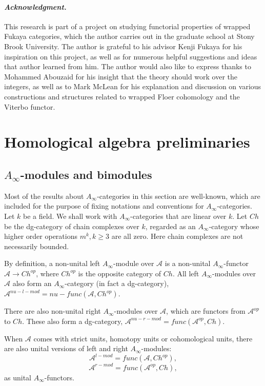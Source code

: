 \documentclass{amsart}
\numberwithin{equation}{section}
\numberwithin{figure}{section}
\begin{document}
\paragraph{\textit{Acknowledgment.}} This research is part of a project on studying functorial properties of wrapped Fukaya categories, which the author carries out in the graduate school at Stony Brook University. The author is grateful to his advisor Kenji Fukaya for his inspiration on this project, as well as for numerous helpful suggestions and ideas that author learned from him. The author would also like to express thanks to Mohammed Abouzaid for his insight that the theory should work over the integers, as well as to Mark McLean for his explanation and discussion on various constructions and structures related to wrapped Floer cohomology and the Viterbo functor.

\section{Homological algebra preliminaries}

\subsection{$A_{\infty}$-modules and bimodules}
	Most of the results about $A_{\infty}$-categories in this section are well-known, which are included for the purpose of fixing notations and conventions for $A_{\infty}$-categories.
	Let $k$ be a field. We shall work with $A_{\infty}$-categories that are linear over $k$. Let $Ch$ be the dg-category of chain complexes over $k$, regarded as an $A_{\infty}$-category whose higher order operations $m^{k}, k \ge 3$ are all zero. Here chain complexes are not necessarily bounded. \par
	By definition, a non-unital left $A_{\infty}$-module over $\mathcal{A}$ is a non-unital $A_{\infty}$-functor $\mathcal{A} \to Ch^{op}$, where $Ch^{op}$ is the opposite category of $Ch$. All left $A_{\infty}$-modules over $\mathcal{A}$ also form an $A_{\infty}$-category (in fact a dg-category), $\mathcal{A}^{nu-l-mod} = nu-func(\mathcal{A}, Ch^{op})$. \par
	There are also non-unital right $A_{\infty}$-modules over $\mathcal{A}$, which are functors from $\mathcal{A}^{op}$ to $Ch$. These also form a dg-category, $\mathcal{A}^{nu-r-mod} = func(\mathcal{A}^{op}, Ch)$. \par
	When $\mathcal{A}$ comes with strict units, homotopy units or cohomological units, there are also unital versions of left and right $A_{\infty}$-modules:
\begin{equation*}
\mathcal{A}^{l-mod} = func(\mathcal{A}, Ch^{op}),
\end{equation*}
\begin{equation*}
\mathcal{A}^{r-mod} = func(\mathcal{A}^{op}, Ch),
\end{equation*}
as unital $A_{\infty}$-functors. \par
\end{document}
